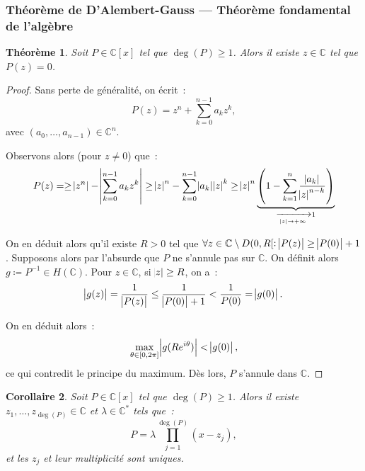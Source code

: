 \documentclass{report}
\newtheorem{thm}{Théorème}[chapter]
\newtheorem{cor}[thm]{Corollaire}
\theoremstyle{definition}
\theoremstyle{remark}
\numberwithin{equation}{section}
\newcommand{\C}{\mathbb C}
\newcommand{\pinfty}{{+\infty}}
\begin{document}
		\subsubsection{Théorème de D'Alembert-Gauss --- Théorème fondamental de l'algèbre}
			\begin{thm} Soit $P \in \C[x]$ tel que $\deg(P) \geq 1$. Alors il existe $z \in \C$ tel que $P(z) = 0$.
			\end{thm}

			\begin{proof} Sans perte de généralité, on écrit~:
			\begin{equation}
				P(z) = z^n + \sum_{k=0}^{n-1}a_kz^k,
			\end{equation}
			avec $(a_0, \ldots, a_{n-1}) \in \C^n$.

			Observons alors (pour $z \neq 0$) que~:
			\begin{equation}
				P(z) = \geq \abs {z^n} - \abs {\sum_{k=0}^{n-1}a_kz^k} \geq \abs z^n - \sum_{k=0}^{n-1}\abs {a_k}\abs z^k
					\geq \abs z^n\underbrace {\left(1 - \sum_{k=1}^n\frac {\abs {a_k}}{\abs z^{n-k}}\right)}_{\xrightarrow[\abs z \to \pinfty]{} 1}
			\end{equation}

			On en déduit alors qu'il existe $R > 0$ tel que $\forall z \in \C \setminus D(0, R[ : \abs {P(z)} \geq \abs {P(0)} + 1$. Supposons alors par l'absurde que $P$ ne
			s'annule pas sur $\C$. On définit alors $g \coloneqq P^{-1} \in H(\C)$. Pour $z \in \C$, si $\abs z \geq R$, on a~:
			\begin{equation}
				\abs {g(z)} = \frac 1{\abs {P(z)}} \leq \frac 1{\abs {P(0)}+1} < \frac 1{P(0)} = \abs {g(0)}.
			\end{equation}

			On  en déduit alors~:
			\begin{equation}
				\max_{\theta \in [0, 2\pi]}\abs {g(Re^{i\theta})} < \abs {g(0)},
			\end{equation}
			ce qui contredit le principe du maximum. Dès lors, $P$ s'annule dans $\C$.
			\end{proof}

			\begin{cor} Soit $P \in \C[x]$ tel que $\deg(P) \geq 1$. Alors il existe $z_1, \ldots, z_{\deg(P)} \in \C$ et $\lambda \in \C^*$ tels que~:
			\begin{equation}
				P = \lambda \prod_{j=1}^{\deg(P)}(x-z_j),
			\end{equation}
			et les $z_j$ et leur multiplicité sont uniques.
			\end{cor}
\end{document}
